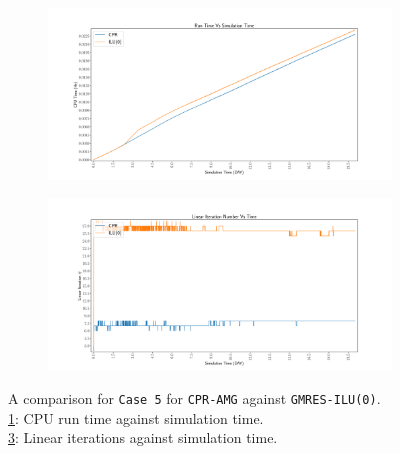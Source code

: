 \begin{figure}
\centering
\begin{subfigure}[b]{\textwidth}
   \includegraphics[width=1\linewidth]{figures/viscous/20x20/cpu_time.pdf}
   \caption{}
   \label{viscous20_cpu}
\end{subfigure}

\begin{subfigure}[b]{\textwidth}
   \includegraphics[width=1\linewidth]{figures/viscous/20x20/its_time.pdf}
   \label{viscous20_its}
\end{subfigure}

\caption[caption]{A comparison for \texttt{Case 5} for \texttt{CPR-AMG} against \texttt{GMRES-ILU(0)}.\\\hspace{\textwidth}
	\cref{viscous20_cpu}: CPU run time against simulation time. \\\hspace{\textwidth}
	\cref{viscous20_its}: Linear iterations against simulation time.\\\hspace{\textwidth}}
\end{figure}

